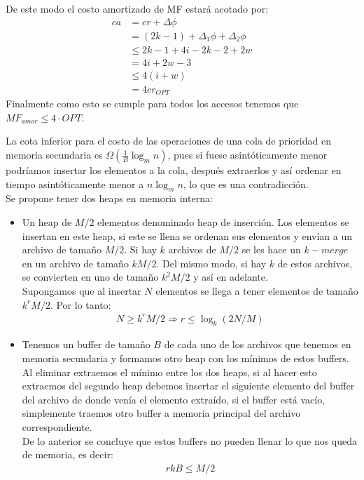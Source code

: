 \documentclass[dcc,uchile]{fcfmcourse}
\begin{document}
\begin{problems}
De este modo el costo amortizado de MF estará acotado por: 
\begin{align*}
    ca &= cr + \Delta \phi\\
    &= (2k-1) + \Delta_{1}\phi + \Delta_{2}\phi\\
    &\le 2k - 1 + 4i - 2k - 2 + 2w\\
    &= 4i + 2w - 3\\
    &\le 4(i+w)\\
    &= 4cr_{OPT}
\end{align*}
Finalmente como esto se cumple para todos los accesos tenemos que $MF_{amor} \le 4\cdot OPT$.
\item La cota inferior para el costo de las operaciones de una cola de prioridad en memoria secundaria es $\Omega\left(\frac{1}{B}\log_{m} n\right)$, pues si fuese asintóticamente menor podríamos insertar los elementos a la cola, después extraerlos y así ordenar en tiempo asintóticamente menor a $n\log_{m}n$, lo que es una contradicción.\\

Se propone tener dos heaps en memoria interna:
\begin{itemize}
    \item Un heap de $M/2$ elementos denominado heap de inserción. Los elementos se insertan en este heap, si este se llena se ordenan sus elementos y envían a un archivo de tamaño $M/2$. Si hay $k$ archivos de $M/2$ se les hace un $k-merge$ en un archivo de tamaño $kM/2$. Del mismo modo, si hay $k$ de estos archivos, se convierten en uno de tamaño $k^2M/2$ y así en adelante.\\ Supongamos que al insertar $N$ elementos se llega a tener elementos de tamaño $k^rM/2$. Por lo tanto:
    \begin{align}
        N \ge k^rM/2 \Rightarrow r\le \log_{k}(2N/M)
    \end{align}
    \item Tenemos un buffer de tamaño $B$ de cada uno de los archivos que tenemos en memoria secundaria y formamos otro heap con los mínimos de estos buffers. Al eliminar extraemos el mínimo entre los dos heaps, si al hacer esto extraemos del segundo heap debemos insertar el siguiente elemento del buffer del archivo de donde venía el elemento extraído, si el buffer está vacío, simplemente traemos otro buffer a memoria principal del archivo correspondiente.\\ De lo anterior se concluye que estos buffers no pueden llenar lo que nos queda de memoria, es decir:
    \begin{align}
        rkB \le M/2
    \end{align}
    

\end{itemize}
\end{problems}
\end{document}

